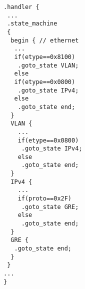 \begin{lstlisting}[escapechar=@]
.handler {
 ...
 .state_machine
 {
  begin { // ethernet
   ...
   if(etype==0x8100)
    .goto_state VLAN;
   else 
   if(etype==0x0800)
    .goto_state IPv4;
   else
    .goto_state end;
  }
  VLAN {
    ...
    if(etype==0x0800)
     .goto_state IPv4;
    else
     .goto_state end;
  }
  IPv4 {
    ...
    if(proto==0x2F)
     .goto_state GRE;
    else
     .goto_state end;
  }
  GRE {
   .goto_state end;
  }
 }  
...
}

\end{lstlisting} 
